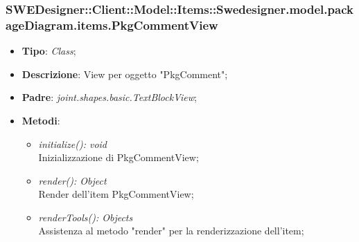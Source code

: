\documentclass[../DefinizioneDiProdotto.tex]{subfiles}
\begin{document}
			\subsubsection{SWEDesigner::Client::Model::Items::Swedesigner.model.packageDiagram.items.PkgCommentView}
			\hypertarget{SWEDesigner::Client::Model::Items::Swedesigner.model.packageDiagram.items.PkgCommentView}{}
			\begin{itemize}
				\item \textbf{Tipo}: \emph{Class};
				\item \textbf{Descrizione}: View per oggetto "PkgComment";
				\item \textbf{Padre}: \emph{joint.shapes.basic.TextBlockView};
				\item \textbf{Metodi}:
				\begin{itemize}
					\item \emph{initialize(): void}\\
					Inizializzazione di PkgCommentView;
					\item \emph{render(): Object}\\
					Render dell'item PkgCommentView;
					\item \emph{renderTools(): Objects}\\
					Assistenza al metodo "render" per la renderizzazione dell'item;
				\end{itemize}
			\end{itemize}
			
\end{document}

